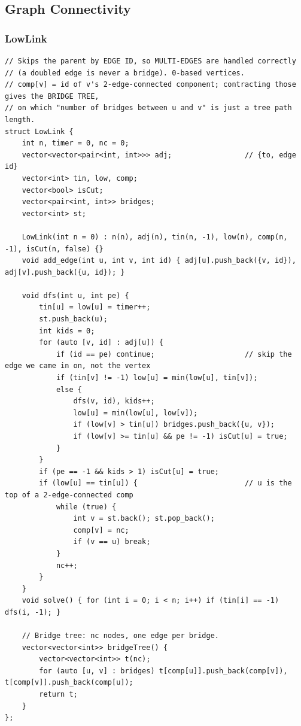 \documentclass[9pt,a4paper,twocolumn]{extarticle}
\begin{document}
\subsection{Graph Connectivity}

\filbreak
\subsubsection{LowLink}
\nopagebreak
\begin{lstlisting}
// Skips the parent by EDGE ID, so MULTI-EDGES are handled correctly
// (a doubled edge is never a bridge). 0-based vertices.
// comp[v] = id of v's 2-edge-connected component; contracting those gives the BRIDGE TREE,
// on which "number of bridges between u and v" is just a tree path length.
struct LowLink {
    int n, timer = 0, nc = 0;
    vector<vector<pair<int, int>>> adj;                 // {to, edge id}
    vector<int> tin, low, comp;
    vector<bool> isCut;
    vector<pair<int, int>> bridges;
    vector<int> st;

    LowLink(int n = 0) : n(n), adj(n), tin(n, -1), low(n), comp(n, -1), isCut(n, false) {}
    void add_edge(int u, int v, int id) { adj[u].push_back({v, id}), adj[v].push_back({u, id}); }

    void dfs(int u, int pe) {
        tin[u] = low[u] = timer++;
        st.push_back(u);
        int kids = 0;
        for (auto [v, id] : adj[u]) {
            if (id == pe) continue;                     // skip the edge we came in on, not the vertex
            if (tin[v] != -1) low[u] = min(low[u], tin[v]);
            else {
                dfs(v, id), kids++;
                low[u] = min(low[u], low[v]);
                if (low[v] > tin[u]) bridges.push_back({u, v});
                if (low[v] >= tin[u] && pe != -1) isCut[u] = true;
            }
        }
        if (pe == -1 && kids > 1) isCut[u] = true;
        if (low[u] == tin[u]) {                         // u is the top of a 2-edge-connected comp
            while (true) {
                int v = st.back(); st.pop_back();
                comp[v] = nc;
                if (v == u) break;
            }
            nc++;
        }
    }
    void solve() { for (int i = 0; i < n; i++) if (tin[i] == -1) dfs(i, -1); }

    // Bridge tree: nc nodes, one edge per bridge.
    vector<vector<int>> bridgeTree() {
        vector<vector<int>> t(nc);
        for (auto [u, v] : bridges) t[comp[u]].push_back(comp[v]), t[comp[v]].push_back(comp[u]);
        return t;
    }
};
\end{lstlisting}
\end{document}
